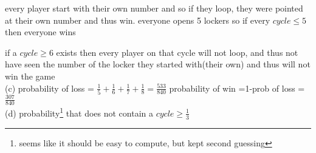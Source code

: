 \documentclass{article}
\newcounter{prob}\setcounter{prob}{1}\newcommand{\prob}{\arabic{prob}.\indent \addtocounter{prob}{1}}
\begin{document}
every player start with their own number and so if they loop, they were pointed at their own number and thus win. everyone opens 5 lockers so if every $cycle \leq 5$ then everyone wins

if a $cycle \geq 6$ exists then every player on that cycle will not loop, and 
thus not have seen the number of the locker they started with(their own) and thus will not win the game\\

(c) probability of loss = $\frac{1}{5}+\frac{1}{6}+\frac{1}{7}+\frac{1}{8}=\frac{533}{840}$
probability of win =1-prob of loss = $\frac{307}{840}$\\

(d) probability\footnote{seems like it should be easy to compute, but kept second guessing} that does not contain a $cycle \geq \frac{1}{3}$ 
\end{document}
